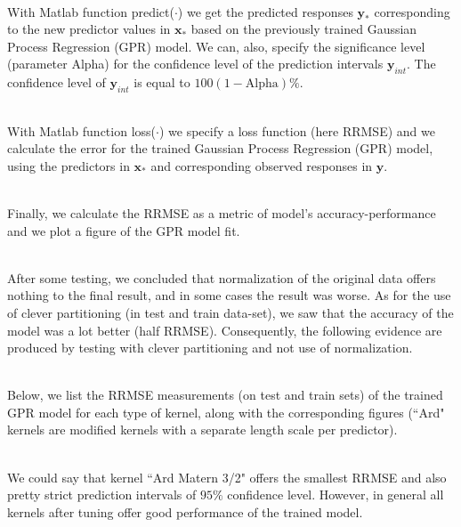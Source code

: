 \documentclass[12pt,a4paper]{article}
\begin{document}
\noindent
\\With Matlab function {\color{blue}predict($\cdot$)} we get the predicted responses $\mathbf{y}_{*}$ corresponding to the new predictor values in $\mathbf{x}_{*}$ based on the previously trained Gaussian Process Regression (GPR) model. We can, also, specify the significance level (parameter Alpha) for the confidence level of the prediction intervals $\mathbf{y}_{int}$. The confidence level of $\mathbf{y}_{int}$ is equal to $100(1 - \text{Alpha})\%$.

\noindent
\\With Matlab function {\color{blue}loss($\cdot$)} we specify a loss function (here RRMSE) and we calculate the error for the trained Gaussian Process Regression (GPR) model, using the predictors in $\mathbf{x}_{*}$ and corresponding observed responses in $\mathbf{y}$.

\noindent
\\Finally, we calculate the RRMSE as a metric of model's accuracy-performance and we plot a figure of the GPR model fit. 

\noindent
\\After some testing, we concluded that normalization of the original data offers nothing to the final result, and in some cases the result was worse. As for the use of clever partitioning (in test and train data-set), we saw that the accuracy of the model was a lot better (half RRMSE). Consequently, the following evidence are produced by testing with clever partitioning and not use of normalization.

\noindent
\\Below, we list the RRMSE measurements (on test and train sets) of the trained GPR model for each type of kernel, along with the corresponding figures (``Ard" kernels are modified kernels with a separate length scale per predictor).

\noindent
\\We could say that kernel ``Ard Matern 3/2" offers the smallest RRMSE and also pretty strict prediction intervals of $95\%$ confidence level. However, in general all kernels after tuning offer good performance of the trained model.
\end{document}

